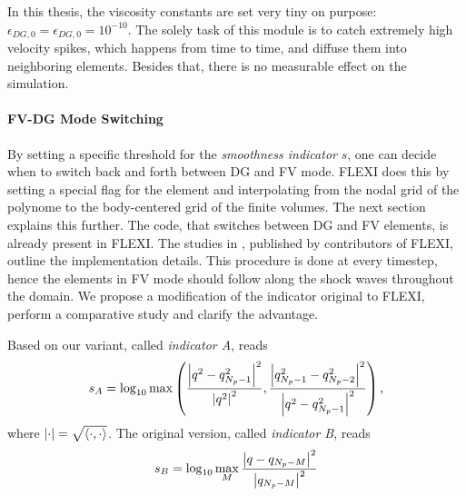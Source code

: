 In this thesis, the viscosity constants are set very tiny on purpose:
$\epsilon_{DG,0} = \epsilon_{DG,0} = 10^{-10}$. The solely task of this module
is to catch extremely high velocity spikes, which happens from time to time,
and diffuse them into neighboring elements. Besides that, there is no measurable
effect on the simulation.

\paragraph{FV-DG Mode Switching}
By setting a specific threshold for the \emph{smoothness indicator} $s$, one
can decide when to switch back and forth between DG and FV mode. FLEXI does
this by setting a special flag for the element and interpolating from the nodal
grid of the polynome to the body-centered grid of the finite volumes. The next
section explains this further. The code, that switches between DG and FV
elements, is already present in FLEXI. The studies in
\cite{balsara2007sub,sonntag2014shock}, published by contributors of FLEXI,
outline the implementation details.  This procedure is done at every timestep,
hence the elements in FV mode should follow along the shock waves throughout
the domain.  We propose a modification of the indicator original to FLEXI,
perform a comparative study and clarify the advantage. 

Based on  our variant, called \emph{indicator
A}, reads
\begin{equation}
\label{eqn:indicator-A}
    s_A = \log_{10} \max \left(
        \frac{\left|q^2 - q_{N_p-1}^2\right|^2}{\left|q^2\right|^2},
        \frac{\left|q_{N_p-1}^2 - q_{N_p-2}^2\right|^2}{\left|q^2 - q_{N_p-1}^2\right|^2}
    \right),
\end{equation}
where $\left|\cdot\right| = \sqrt{\left\langle\cdot,\cdot\right\rangle}$.  The original version, called
\emph{indicator B}, reads
\begin{equation}
\label{eqn:indicator-B}
    s_B = \log_{10} \max_M \frac{\left|q - q_{N_p-M}\right|^2}{\left|q_{N_p-M}\right|^2}
\end{equation}

